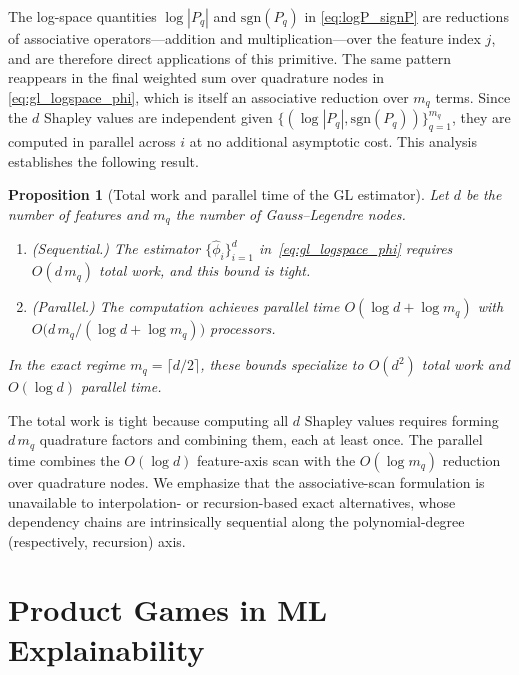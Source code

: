 \documentclass{article}
\newtheorem{proposition}{Proposition}
\begin{document}
The log-space quantities $\log|P_q|$ and $\mathrm{sgn}(P_q)$ in \cref{eq:logP_signP} are reductions of associative operators---addition and multiplication---over the feature index $j$, and are therefore direct applications of this primitive. The same pattern reappears in the final weighted sum over quadrature nodes in \cref{eq:gl_logspace_phi}, which is itself an associative reduction over $m_q$ terms. Since the $d$ Shapley values are independent given $\{(\log|P_q|,\mathrm{sgn}(P_q))\}_{q=1}^{m_q}$, they are computed in parallel across $i$ at no additional asymptotic cost. This analysis establishes the following result.

\begin{proposition}[Total work and parallel time of the GL estimator]
\label{prop:complexity}
Let $d$ be the number of features and $m_q$ the number of Gauss--Legendre nodes.
\begin{enumerate}
  \item \emph{(Sequential.)} The estimator $\{\widehat{\phi}_i\}_{i=1}^d$
  in~\cref{eq:gl_logspace_phi} requires $O(d\,m_q)$ total work, and this bound is tight.
  \item \emph{(Parallel.)} The computation achieves parallel time
  $O(\log d + \log m_q)$ with $O\!\bigl(d\,m_q/(\log d+\log m_q)\bigr)$ processors.
\end{enumerate}
In the exact regime $m_q=\lceil d/2\rceil$, these bounds specialize to
$O(d^2)$ total work and $O(\log d)$ parallel time.
\end{proposition}

The total work is tight because computing all $d$ Shapley values requires forming $d\,m_q$ quadrature factors and combining them, each at least once. The parallel time combines the $O(\log d)$ feature-axis scan with the $O(\log m_q)$ reduction over quadrature nodes. We emphasize that the associative-scan formulation is unavailable to interpolation- or recursion-based exact alternatives, whose dependency chains are intrinsically sequential along the polynomial-degree (respectively, recursion) axis.







\section{Product Games in ML Explainability}
\end{document}
